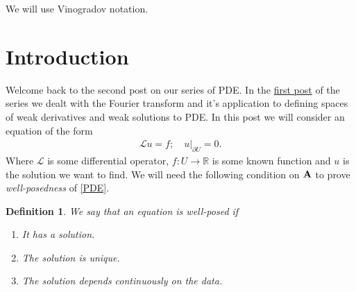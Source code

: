\documentclass[
    a4paper,
    DIV=14,
    abstract=true,
    numbers=noenddot
]
{scrartcl}
\newtheorem{definition}[theorem]{Definition}
\theoremstyle{definition}
\newcommand\restr[2]{\left.#1\right|_{#2}}
\newcommand{\R}{\mathbb{R}}
\newcommand{\Ll}{\mathcal{L}}
\begin{document}
We will use Vinogradov notation.

\section{Introduction}
Welcome back to the second post on our series of PDE. In the \href{https://nowheredifferentiable.com/2023-01-29-PDE-1/}{first post} of the series we dealt with the Fourier transform and it's application to defining spaces of weak derivatives and weak solutions to PDE. In this post we will consider an equation of the form
\begin{align}\label{PDE}
	\Ll u =f; \quad \restr{u}{\partial U} =0.
\end{align}
Where $\Ll$ is some differential operator, $f: U \to  \R$  is some known function and $u$ is the solution we want to find. We will need the following condition on $\vb{A}$  to prove \emph{well-posedness} of \eqref{PDE}.
\begin{definition} We say that an equation is \emph{well-posed} if
	\begin{enumerate}
		\item It has a solution.
		\item The solution is unique.
		\item The solution depends continuously on the data.
	\end{enumerate}

\end{definition}
\end{document}
